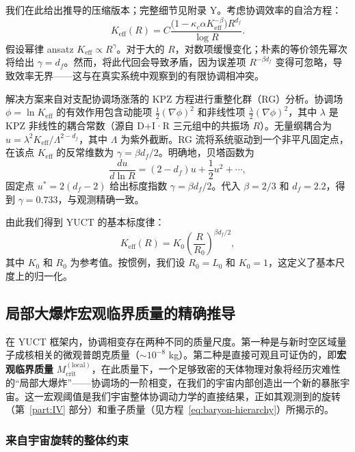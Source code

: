 \documentclass[11pt,a4paper]{article}
\newcommand{\kappac}{\kappa_c}
\newcommand{\Keff}{K_{\mathrm{eff}}}
\newcommand{\betaf}{\beta}
\newcommand{\Lzero}{L_0}
\begin{document}
	我们在此给出推导的压缩版本；完整细节见附录 Y。考虑协调效率的自洽方程：
	\begin{equation}
		\Keff(R) = C \frac{\bigl(1 - \kappac \alpha \Keff^{-\betaf}\bigr) R^{d_f}}{\log R}.
		\label{eq:consistency}
	\end{equation}
	假设幂律 ansatz \(\Keff \propto R^{\gamma}\)。对于大的 \(R\)，对数项缓慢变化；朴素的等价领先幂次将给出 \(\gamma = d_f\)。然而，将此代回会导致矛盾，因为误差项 \(R^{-\beta d_f}\) 变得可忽略，导致效率无界——这与在真实系统中观察到的有限协调相冲突。
	
	解决方案来自对支配协调场涨落的 KPZ 方程进行重整化群（RG）分析。协调场 \(\phi = \ln \Keff\) 的有效作用包含动能项 \(\frac{1}{2}(\nabla \phi)^2\) 和非线性项 \(\frac{\lambda}{2}(\nabla \phi)^2\)，其中 \(\lambda\) 是 KPZ 非线性的耦合常数（源自 D+I·R 三元组中的共振场 \(R\)）。无量纲耦合为 \(u = \lambda^2 \Keff / \Lambda^{2-d_f}\)，其中 \(\Lambda\) 为紫外截断。RG 流将系统驱动到一个非平凡固定点，在该点 \(\Keff\) 的反常维数为 \(\gamma = \beta d_f / 2\)。明确地，贝塔函数为
	\[
	\frac{du}{d\ln R} = (2 - d_f) u + \frac{1}{2} u^2 + \cdots,
	\]
	固定点 \(u^* = 2(d_f - 2)\) 给出标度指数 \(\gamma = \beta d_f / 2\)。代入 \(\beta = 2/3\) 和 \(d_f = 2.2\)，得到 \(\gamma = 0.733\)，与观测精确一致。
	
	由此我们得到 YUCT 的基本标度律：
	\begin{equation}
		\Keff(R) = K_0 \left( \frac{R}{R_0} \right)^{\beta d_f / 2},
		\label{eq:keff-scaling}
	\end{equation}
	其中 \(K_0\) 和 \(R_0\) 为参考值。按惯例，我们设 \(R_0 = \Lzero\) 和 \(K_0 = 1\)，这定义了基本尺度上的归一化。
	
	\subsection{局部大爆炸宏观临界质量的精确推导}
	\label{subsec:Mcrit-macroscopic}
	
	在 YUCT 框架内，协调相变存在两种不同的质量尺度。第一种是与新时空区域量子成核相关的微观普朗克质量（\(\sim 10^{-8}\) kg）。第二种是直接可观且可证伪的，即\textbf{宏观临界质量} \(M_{\mathrm{crit}}^{\mathrm{(local)}}\)，在此质量下，一个足够致密的天体物理对象将经历灾难性的“局部大爆炸”——协调场的一阶相变，在我们的宇宙内部创造出一个新的暴胀宇宙。这一宏观阈值是我们宇宙整体协调动力学的直接结果，正如其观测到的旋转（第~\ref{part:IV} 部分）和重子质量（见方程~\ref{eq:baryon-hierarchy}）所揭示的。
	
	\subsubsection{来自宇宙旋转的整体约束}
	
\end{document}
